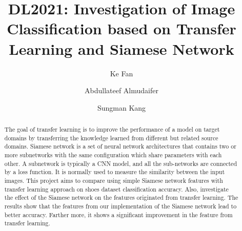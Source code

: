 \documentclass[sigconf]{acmart}
\begin{document}
\title{DL2021: Investigation of Image Classification based on Transfer Learning and Siamese Network}

  
\author{Ke Fan}
  
\author{Abdullateef Almudaifer}
  
\author{Sungman Kang}



\begin{abstract}
The goal of transfer learning is to improve the performance of a model on target domains by transferring the knowledge learned from different but related source domains. Siamese network is a set of neural network architectures that contains two or more subnetworks with the same configuration which share parameters with each other. A subnetwork is typically a CNN model, and all the sub-networks are connected by a loss function. It is normally used to measure the similarity between the input images. This project aims to compare using simple Siamese network features with transfer learning approach on shoes dataset classification accuracy. Also, investigate the effect of the Siamese network on the features originated from transfer learning. The results show that the features from our implementation of the Siamese network lead to better accuracy. Farther more, it shows a significant improvement in the feature from transfer learning.
\end{abstract}
\end{document}
